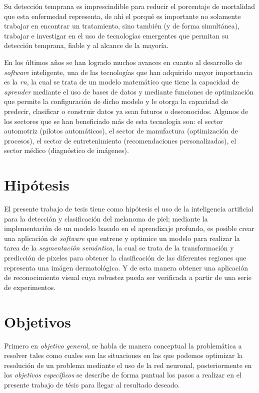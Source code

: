  Su detección temprana es imprescindible para reducir el porcentaje de mortalidad que esta enfermedad representa, de ahí el porqué es importante no solamente trabajar en encontrar un tratamiento, sino también (y de forma simultánea), trabajar e investigar en el uso de tecnologías emergentes que permitan su detección temprana, fiable y al alcance de la mayoría.

En los últimos años se han logrado muchos avances en cuanto al desarrollo de \emph{software} inteligente, una de las tecnologías que han adquirido mayor importancia es la \emph{\gls{rn}}, la cual se trata de un modelo matemático que tiene la capacidad de \emph{aprender} mediante el uso de bases de datos y mediante funciones de optimización que permite la configuración de dicho modelo y le otorga la capacidad de predecir, clasificar o construir datos ya sean futuros o desconocidos. Algunos de los sectores que se han beneficiado más de esta tecnología son: el sector automotriz (pilotos automáticos), el sector de manufactura (optimización de procesos), el sector de entretenimiento (recomendaciones personalizadas), el sector médico (diagnóstico de imágenes). 


\section{Hipótesis}
El presente trabajo de tesis tiene como hipótesis el uso de la inteligencia artificial para la detección y clasificación del melanoma de piel; mediante la implementación de un modelo basado en el aprendizaje profundo, es posible crear una aplicación de \emph{software} que entrene y optimice un modelo para realizar la tarea de la \emph{segmentación semántica}, la cual se trata de la transformación y predicción de pixeles para obtener la clasificación de las diferentes regiones que representa una imágen dermatológica. Y de esta manera obtener una aplicación de reconocimiento visual cuya robustez pueda ser verificada a partir de una serie de experimentos.



\section{Objetivos}
Primero en \emph{objetivo general}, se habla de manera conceptual la problemática a resolver tales como cuales son las situaciones en las que podemos optimizar la resolución de un problema mediante el uso de la red neuronal, posteriormente en los \emph{objetivos específicos} se describe de forma puntual los pasos a realizar en el presente trabajo de tésis para llegar al resultado deseado.

